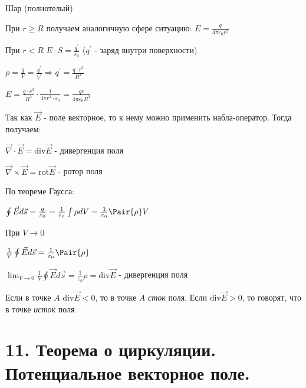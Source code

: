 \documentclass[12pt]{article}
\begin{document}
     Шар (полнотелый)

    При $r \geq R$ получаем аналогичную сфере ситуацию: $E = \frac{q}{4\pi \varepsilon_0 r^2}$

    При $r < R$ $E \cdot S = \frac{q^\prime}{\varepsilon_0}$ ($q^\prime$ - заряд внутри поверхности)

    $\rho = \frac{q}{V} = \frac{q^\prime}{V^\prime} \Longrightarrow q^\prime = \frac{q \cdot r^3}{R^3}$

    $E = \frac{q \cdot r^3}{R^3} \cdot \frac{1}{4\pi r^2 \cdot \varepsilon_0} = \frac{q r}{4\pi \varepsilon_0 R^3}$

    \mediumvspace

    Так как $\vec{E}$ - поле векторное, то к нему можно применить набла-оператор. Тогда получаем:

    $\vec{\nabla} \cdot \vec{E} = \mathrm{div}\vec{E}$ - дивергенция поля

    $\vec\nabla \times \vec{E} = \mathrm{rot}\vec{E}$ - ротор поля

    По теореме Гаусса:

    $\oint \vec{E} d\vec{s} = \frac{q}{\varepsilon_0} = \frac{1}{\varepsilon_0} \int \rho dV = 
    \frac{1}{\varepsilon_0} \Pair{\rho} V$

    При $V \to 0$

    $\frac{1}{V} \oint \vec{E} d\vec{s} = \frac{1}{\varepsilon_0} \Pair{\rho}$

    $\lim_{V \to 0} \frac{1}{V} \oint \vec{E} d\vec{s} = \frac{1}{\varepsilon_0} \rho = \mathrm{div}\vec{E}$ - дивергенция поля

    Если в точке $A$ $\mathrm{div} \vec{E} < 0$, то в точке $A$ \textit{сток} поля. Если $\mathrm{div} \vec{E} > 0$, 
    то говорят, что в точке \textit{исток} поля






\section{11. Теорема о циркуляции. Потенциальное векторное поле.}
\end{document}
